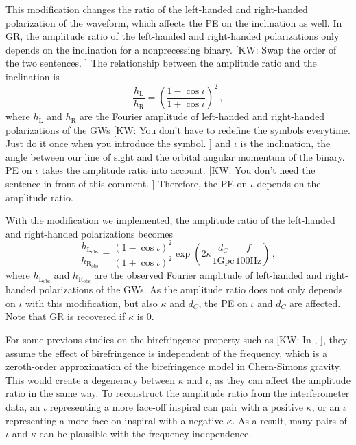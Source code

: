 \documentclass[aps,prd,twocolumn,superscriptaddress,preprintnumbers,floatfix,nofootinbib]{revtex4-2}
\newcommand{\kw}[1]{{\color{rb4}[KW: #1 ]}}
\begin{document}
This modification changes the ratio of the left-handed and right-handed polarization of the waveform, which affects the PE on the inclination as well.
In GR, the amplitude ratio of the left-handed and right-handed polarizations only depends on the inclination for a nonprecessing binary. \kw{Swap the order of the two sentences.}
The relationship between the amplitude ratio and the inclination is
\begin{equation}
    \frac{h_\mathrm{L}}{h_\mathrm{R}}=\left(\frac{1-\cos\iota}{1+\cos\iota}\right)^2\,,
\end{equation}
where $h_\mathrm{L}$ and $h_\mathrm{R}$ are the Fourier amplitude of left-handed
and right-handed polarizations of the GWs \kw{You don't have to redefine the
symbols everytime. Just do it once when you introduce the symbol.} and $\iota$
is the inclination, the angle between our line of sight and the orbital angular
momentum of the binary. PE on $\iota$ takes the amplitude ratio into account. \kw{You don't need the sentence in front of this comment.}
Therefore, the PE on $\iota$ depends on the amplitude ratio. 

With the modification we implemented, the amplitude ratio of the left-handed and right-handed polarizations becomes 
\begin{equation}
    \frac{h_\mathrm{L_{obs}}}{h_\mathrm{R_{obs}}}=\frac{\left(1-\cos\iota\right)^2}{\left(1+\cos\iota\right)^2}\exp\left({2\kappa\frac{d_C}{1\mathrm{Gpc}}\frac{f}{100\mathrm{Hz}}}\right)\,,
\end{equation}
where $h_\mathrm{L_{obs}}$ and $h_\mathrm{R_{obs}}$ are the observed Fourier amplitude of left-handed and right-handed polarizations of the GWs.
As the amplitude ratio does not only depends on $\iota$ with this modification, but also $\kappa$ and $d_C$, the PE on $\iota$ and $d_C$ are affected. Note that GR is recovered if $\kappa$ is $0$.

For some previous studies on the birefringence property such as \citet{Okounkova_2022} \kw{In \citet{Okounkova_2022},}, they assume the effect of birefringence is independent of the frequency, which is a zeroth-order approximation of the birefringence model in Chern-Simons gravity.
This would create a degeneracy between $\kappa$ and $\iota$, as they can affect the amplitude ratio in the same way.
To reconstruct the amplitude ratio from the interferometer data, an $\iota$ representing a more face-off inspiral can pair with a positive $\kappa$, or an $\iota$ representing a more face-on inspiral with a negative $\kappa$.
As a result, many pairs of $\iota$ and $\kappa$ can be plausible with the frequency independence.
\end{document}
